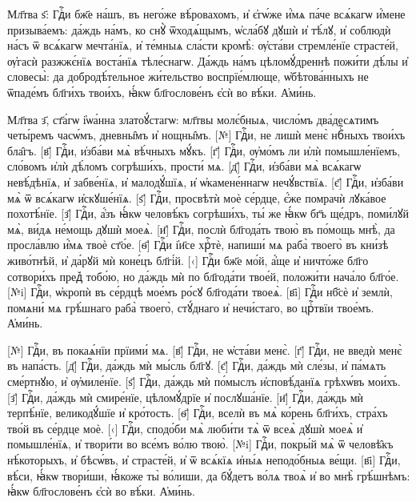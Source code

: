 \documentclass[20pt]{extarticle}
\begin{document}
Мл҃тва ѕ҃:
Гдⷭ҇и бж҃е на́шъ, въ него́же вѣ́ровахомъ, и҆ є҆гѡ́же и҆́мѧ па́че всѧ́кагѡ и҆́мене призыва́емъ: да́ждь на́мъ, ко снꙋ̀ ѿходѧ́щымъ, ѡ҆сла́бꙋ дꙋшѝ и҆ тѣ́лꙋ, и҆ соблюдѝ на́съ ѿ всѧ́кагѡ мечта́нїѧ, и҆ те́мныѧ сла́сти кромѣ̀: ѹ҆ста́ви стремле́нїе страсте́й, ѹ҆гасѝ разжжє́нїѧ воста́нїѧ тѣле́снагѡ. Да́ждь на́мъ цѣломꙋ́дреннѣ пожи́ти дѣ́лы и҆ словесы̀: да добродѣ́тельное жи́тельство воспрїе́млюще, ѡ҆бѣтова́нныхъ не ѿпаде́мъ бл҃ги́хъ твои́хъ, ꙗ҆́кѡ бл҃гослове́нъ є҆сѝ во вѣ́ки. А҆ми́нь.

Мл҃тва з҃, ст҃а́гѡ і҆ѡа́нна златоꙋ́стагѡ: мл҃твы молє́бныѧ, число́мъ два́десѧтимъ четы́ремъ часѡ́мъ, дневны̑мъ и҆ нощны̑мъ.
[№] Гдⷭ҇и, не лишѝ менє̀ нбⷭ҇ныхъ твои́хъ бла̑гъ. [в҃] Гдⷭ҇и, и҆зба́ви мѧ̀ вѣ́чныхъ мꙋ́къ. [г҃] Гдⷭ҇и, ѹ҆мо́мъ ли и҆лѝ помышле́нїемъ, сло́вомъ и҆лѝ дѣ́ломъ согрѣши́хъ, прости́ мѧ. [д҃] Гдⷭ҇и, и҆зба́ви мѧ̀ всѧ́кагѡ невѣ́дѣнїѧ, и҆ забве́нїѧ, и҆ малодꙋ́шїѧ, и҆ ѡ҆камене́ннагѡ нечꙋ́вствїѧ. [є҃] Гдⷭ҇и, и҆зба́ви мѧ̀ ѿ всѧ́кагѡ и҆скꙋше́нїѧ. [ѕ҃] Гдⷭ҇и, просвѣтѝ моѐ се́рдце, є҆́же помрачѝ лꙋка́вое похотѣ́нїе. [з҃] Гдⷭ҇и, а҆́зъ ꙗ҆́кѡ человѣ́къ согрѣши́хъ, ты́ же ꙗ҆́кѡ бг҃ъ ще́дръ, поми́лꙋй мѧ̀, ви́дѧ не́мощь дꙋшѝ моеѧ̀. [и҃] Гдⷭ҇и, послѝ бл҃года́ть твою̀ въ по́мощь мнѣ̀, да просла́влю и҆́мѧ твоѐ ст҃о́е. [ѳ҃] Гдⷭ҇и і҆и҃се хрⷭ҇тѐ, напиши́ мѧ раба̀ твоего̀ въ кни́зѣ живо́тнѣй, и҆ да́рꙋй мѝ коне́цъ бл҃гі́й. [‹] Гдⷭ҇и бж҃е мо́й, а҆́ще и҆ ничто́же бл҃го сотвори́хъ пред꙽ тобо́ю, но да́ждь мѝ по бл҃года́ти твое́й, положи́ти нача́ло бл҃го́е. [№i] Гдⷭ҇и, ѡ҆кропѝ въ се́рдцѣ мое́мъ ро́сꙋ бл҃года́ти твоеѧ̀. [в҃i] Гдⷭ҇и нб҃сѐ и҆ землѝ, помѧни́ мѧ грѣ́шнаго раба̀ твоего̀, стꙋ́днаго и҆ нечи́стаго, во црⷭ҇твїи твое́мъ. А҆ми́нь.

[№] Гдⷭ҇и, въ покаѧ́нїи прїими́ мѧ. [в҃] Гдⷭ҇и, не ѡ҆ста́ви менє̀. [г҃] Гдⷭ҇и, не введѝ менє̀ въ напа́сть. [д҃] Гдⷭ҇и, да́ждь мѝ мы́сль бл҃гꙋ. [є҃] Гдⷭ҇и, да́ждь мѝ сле́зы, и҆ па́мѧть сме́ртнꙋю, и҆ ѹ҆миле́нїе. [ѕ҃] Гдⷭ҇и, да́ждь мѝ по́мыслъ и҆сповѣ́данїѧ грѣхѡ́въ мои́хъ. [з҃] Гдⷭ҇и, да́ждь мѝ смире́нїе, цѣломꙋ́дрїе и҆ послꙋша́нїе. [и҃] Гдⷭ҇и, да́ждь мѝ терпѣ́нїе, великодꙋ́шїе и҆ кро́тость. [ѳ҃] Гдⷭ҇и, вселѝ въ мѧ̀ ко́рень бл҃ги́хъ, стра́хъ тво́й въ се́рдце моѐ. [‹] Гдⷭ҇и, сподо́би мѧ̀ люби́ти тѧ̀ ѿ всеѧ̀ дꙋшѝ моеѧ̀ и҆ помышле́нїѧ, и҆ твори́ти во все́мъ во́лю твою̀. [№i] Гдⷭ҇и, покры́й мѧ̀ ѿ человѣ̑къ нѣ́которыхъ, и҆ бѣсѡ́въ, и҆ страсте́й, и҆ ѿ всѧ́кїѧ и҆ны́ѧ неподо́бныѧ ве́щи. [в҃i] Гдⷭ҇и, вѣ́си, ꙗ҆́кѡ твори́ши, ꙗ҆́коже ты̀ во́лиши, да бꙋ́детъ во́лѧ твоѧ̀ и҆ во мнѣ̀ грѣ́шнѣмъ: ꙗ҆́кѡ бл҃гослове́нъ є҆сѝ во вѣ́ки. А҆ми́нь.
\end{document}
